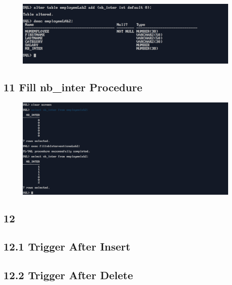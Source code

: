 

\vspace{0.25cm}
\begin{figure}[ht]
    \centering
    \includegraphics[width=\textwidth]{SQL/examples/PLSQL/EX1/PNG/ex11.1.png}
\end{figure}


\subsection*{11 Fill nb\_inter Procedure}



\vspace{0.25cm}
\begin{figure}[ht]
    \centering
    \includegraphics[width=\textwidth]{SQL/examples/PLSQL/EX1/PNG/ex11.2.png}
\end{figure}


\subsection*{12 }
\subsection*{12.1 Trigger After Insert}



\subsection*{12.2 Trigger After Delete}

